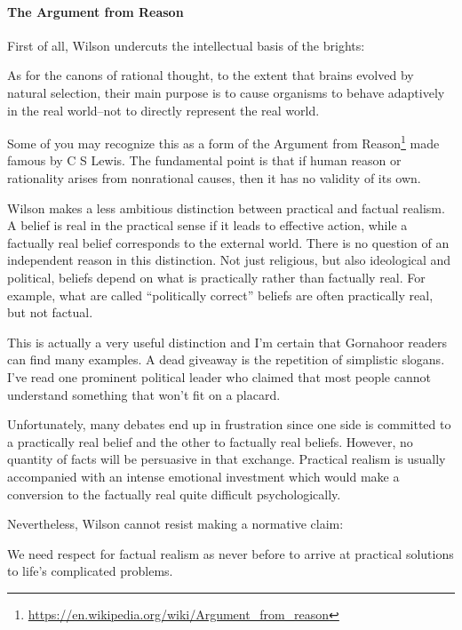 \paragraph{The Argument from Reason}


First of all, Wilson undercuts the intellectual basis of the brights:

\begin{quotex}
As for the canons of rational thought, to the extent that brains evolved by natural selection, their main purpose is to cause organisms to behave adaptively in the real world--not to directly represent the real world.
\end{quotex}


Some of you may recognize this as a form of the Argument from Reason\footnote{\url{https://en.wikipedia.org/wiki/Argument_from_reason}} made famous by C S Lewis. The fundamental point is that if human reason or rationality arises from nonrational causes, then it has no validity of its own.

Wilson makes a less ambitious distinction between practical and factual realism. A belief is real in the practical sense if it leads to effective action, while a factually real belief corresponds to the external world. There is no question of an independent reason in this distinction. Not just religious, but also ideological and political, beliefs depend on what is practically rather than factually real. For example, what are called ``politically correct'' beliefs are often practically real, but not factual.

This is actually a very useful distinction and I'm certain that Gornahoor readers can find many examples. A dead giveaway is the repetition of simplistic slogans. I've read one prominent political leader who claimed that most people cannot understand something that won't fit on a placard.

Unfortunately, many debates end up in frustration since one side is committed to a practically real belief and the other to factually real beliefs. However, no quantity of facts will be persuasive in that exchange. Practical realism is usually accompanied with an intense emotional investment which would make a conversion to the factually real quite difficult psychologically.

Nevertheless, Wilson cannot resist making a normative claim:

\begin{quotex}
We need respect for factual realism as never before to arrive at practical solutions to life's complicated problems.
\end{quotex}


